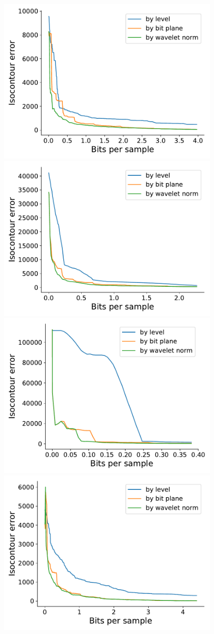 \begin{figure}[h]
  \centering
  {\includegraphics[width=0.48\linewidth]{img/motivation/motivation-isocontour-boiler.pdf}}
 	{\includegraphics[width=0.48\linewidth]{img/motivation/motivation-isocontour-diffusivity.pdf}}
 	{\includegraphics[width=0.48\linewidth]{img/motivation/motivation-isocontour-euler.pdf}}
 	{\includegraphics[width=0.48\linewidth]{img/motivation/motivation-isocontour-turbulence.pdf}}

\end{figure}
